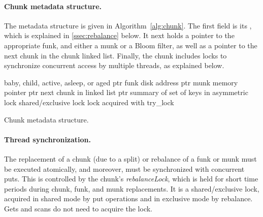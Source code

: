 \paragraph{Chunk metadata structure.}

The metadata structure is given in Algorithm~\ref{alg:chunk}. 
The first field is its , which is explained in \cref{ssec:rebalance}  below. 
It next holds a pointer to the appropriate funk, and either a munk or a Bloom filter, as well as a pointer to the next 
chunk in the chunk linked list.
Finally, the chunk includes locks to synchronize concurrent access by multiple threads, as explained below.

\begin{algorithm}[htb]

\begin{algorithmic}
\State {} \Comment  baby, child, active, asleep, or aged
\State ptr  \Comment funk disk address
\State ptr  \Comment munk memory pointer
\State ptr  \Comment next chunk in linked list
\State ptr  \Comment summary of set of keys in 
\State asymmetric lock  \Comment shared/exclusive lock 
\State lock  \Comment acquired with try\_lock 
\end{algorithmic}

\caption{Chunk metadata structure.}
\label{alg:chunk}
\end{algorithm}


\paragraph{Thread synchronization.}

The replacement of a chunk (due to a split) or rebalance of a funk or munk %
must be executed atomically, and moreover, must be synchronized with concurrent puts. 
This is controlled by the chunk's \emph{rebalanceLock}, which is held for short time periods
during chunk, funk, and munk replacements.  It is a shared/exclusive lock, acquired in shared mode 
by put operations and in exclusive mode by rebalance. Gets and scans do not need to acquire the lock.

